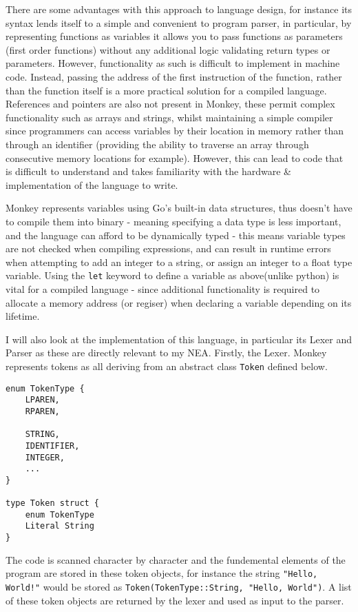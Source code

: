 There are some advantages with this approach to language design, for instance its syntax lends itself to a simple and convenient to program parser, in particular, by representing functions as variables it allows you to pass functions as parameters (first order functions) without any additional logic validating return types or parameters. However, functionality as such is difficult to implement in machine code. Instead, passing the address of the first instruction of the function, rather than the function itself is a more practical solution for a compiled language. References and pointers are also not present in Monkey, these permit complex functionality such as arrays and strings, whilst maintaining a simple compiler since programmers can access variables by their location in memory rather than through an identifier (providing the ability to traverse an array through consecutive memory locations for example). However, this can lead to code that is difficult to understand and takes familiarity with the hardware \& implementation of the language to write. 

Monkey represents variables using Go's built-in data structures, thus doesn't have to compile them into binary - meaning specifying a data type is less important, and the language can afford to be dynamically typed - this means variable types are not checked when compiling expressions, and can result in runtime errors when attempting to add an integer to a string, or assign an integer to a float type variable. Using the \texttt{let} keyword to define a variable as above(unlike python) is vital for a compiled language - since additional functionality is required to allocate a memory address (or regiser) when declaring a variable depending on its lifetime.

I will also look at the implementation of this language, in particular its Lexer and Parser as these are directly relevant to my NEA. Firstly, the Lexer. Monkey represents tokens as all deriving from an abstract class \texttt{Token} defined below.

\begin{lstlisting}
enum TokenType {
    LPAREN,
    RPAREN,

    STRING,
    IDENTIFIER,
    INTEGER,
    ...
}

type Token struct {
    enum TokenType
    Literal String
}
\end{lstlisting}

The code is scanned character by character and the fundemental elements of the program are stored in these token objects, for instance the string \texttt{"Hello, World!"} would be stored as \texttt{Token(TokenType::String, "Hello, World")}. A list of these token objects are returned by the lexer and used as input to the parser.

